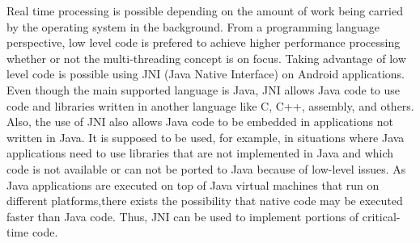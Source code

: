 \documentclass[12pt]{article}
\begin{document}
Real time processing is possible depending on the amount of work being carried by the operating system in the
background. From a programming language perspective, low level code is prefered
to achieve higher performance processing whether or not the
multi-threading concept is on focus. Taking advantage of low level code is
possible using JNI (Java Native Interface) on Android applications. Even
though the main supported language is Java, JNI allows Java code to use code and
libraries written in another language like C,  C++, assembly, and others. Also, the
use of JNI also allows Java code to be embedded in  applications not written in
Java. It is supposed to be used, for example, in situations where Java applications need
to use libraries that are not implemented in Java and which code is not available or  can not be ported to Java because of low-level issues.
As Java  applications are executed on top of Java virtual machines that run on different platforms,there exists the possibility that native code may be executed faster than Java code. Thus, JNI can be  used to implement portions of critical-time code.

\end{document}
